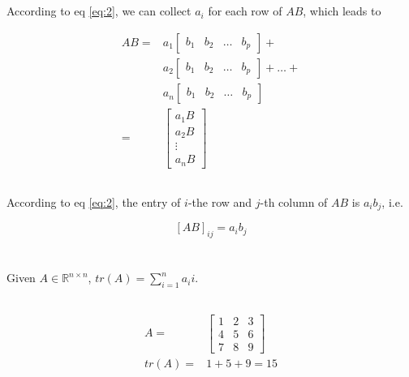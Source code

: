 \documentclass{article}
\newcommand{\RR}{\mathbb{R}}
\begin{document}
\subsection{}
According to eq \eqref{eq:2}, we can collect $a_i$ for each row of $AB$, which leads to

\begin{align*}
    AB = & 
    a_1
    \begin{bmatrix}
        b_1 & b_2 & \dots &b_p
    \end{bmatrix}
    +\\ &
    a_2
    \begin{bmatrix}
        b_1 & b_2 & \dots &b_p
    \end{bmatrix}
    +
    \dots
    +\\ &
    a_n
    \begin{bmatrix}
        b_1 & b_2 & \dots &b_p
    \end{bmatrix}\\
    = & 
    \begin{bmatrix}
        a_1B \\ a_2B \\ \vdots \\ a_nB
    \end{bmatrix}
\end{align*}

\subsection{}
According to eq \eqref{eq:2}, the entry of $i$-the row and $j$-th column of $AB$ is $a_ib_j$, i.e. 

$$
[AB]_{ij} = a_ib_j
$$

\section{}

Given $A\in \RR^{n\times n}$, $tr(A) = \sum_{i=1}^{n}a_ii$.

\subsection{}

\begin{align*}
    A = & 
    \begin{bmatrix}
        1 & 2 & 3\\
        4 & 5 & 6\\
        7 & 8 & 9
    \end{bmatrix}\\
    tr(A) = & 1+5+9 = 15
\end{align*}
\end{document}
